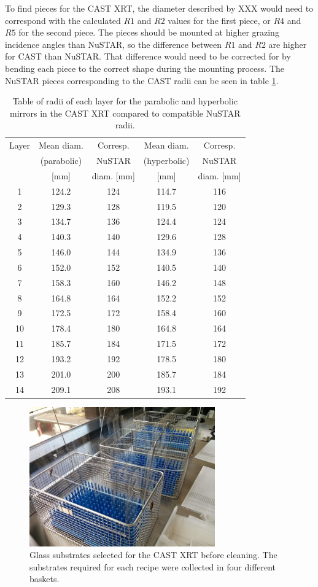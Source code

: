 To find pieces for the CAST XRT, the diameter described by XXX would need to correspond with the calculated $\mathit{R1}$ and $\mathit{R2}$ values for the first piece, or $\mathit{R4}$ and $\mathit{R5}$ for the second piece. The pieces should be mounted at higher grazing incidence angles than NuSTAR, so the difference between $\mathit{R1}$ and $\mathit{R2}$ are higher for CAST than NuSTAR. That difference would need to be corrected for by bending each piece to the correct shape during the mounting process. The NuSTAR pieces corresponding to the CAST radii can be seen in table \ref{tab:cast_pieces}.

\begin{table}[p]
\begin{center}
\begin{tabular}{c|c|c|c|c}
Layer & Mean diam. & Corresp. & Mean diam. & Corresp. \\
& (parabolic)  & NuSTAR & (hyperbolic)  & NuSTAR  \\
& [mm] &  diam. [mm] & [mm] &  diam. [mm]\\
\hline
1&124.2&124&114.7&116\\
2&129.3&128&119.5&120\\
3&134.7&136&124.4&124\\
4&140.3&140&129.6&128\\
5&146.0&144&134.9&136\\
6&152.0&152&140.5&140\\
7&158.3&160&146.2&148\\
8&164.8&164&152.2&152\\
9&172.5&172&158.4&160\\
10&178.4&180&164.8&164\\
11&185.7&184&171.5&172\\
12&193.2&192&178.5&180\\
13&201.0&200&185.7&184\\
14&209.1&208&193.1&192
\end{tabular}
\end{center}
\caption{\footnotesize Table of radii of each layer for the parabolic and hyperbolic mirrors in the CAST XRT compared to compatible NuSTAR radii.}\label{tab:cast_pieces}
\end{table}

\begin{figure}[htbp]
  \centering  \includegraphics[height=6cm]{figures/cast/pieces_for_cleaning.jpg}
  \caption{\footnotesize Glass substrates selected for the CAST XRT before cleaning. The substrates required for each recipe were collected in four different baskets.}
  \label{fig:pieces_for_cleaning}
\end{figure}

